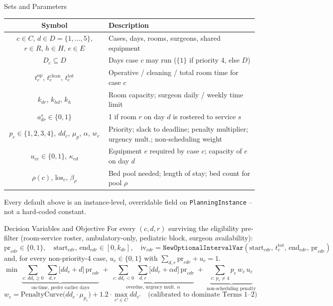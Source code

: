 \documentclass[aspectratio=169]{beamer}
\begin{document}
\begin{frame}{Sets and Parameters}
  \footnotesize
  \begin{table}
    \centering\tiny
    \begin{tabular}{cl}
      \toprule
      Symbol & Description \\
      \midrule
      $c \in C$, $d \in D=\{1,\ldots,5\}$, $r \in R$, $h \in H$, $e \in E$ & Cases, days,
        rooms, surgeons, shared equipment \\
      $D_c \subseteq D$ & Days case $c$ may run ($\{1\}$ if priority 4, else $D$) \\
      $t_c^{\text{op}}$, $t_c^{\text{clean}}$, $t_c^{\text{tot}}$ & Operative / cleaning
        / total room time for case $c$ \\
      $k_{dr}$, $k_{hd}$, $k_h$ & Room capacity; surgeon daily / weekly time limit \\
      $a_{dr}^{s}\in\{0,1\}$ & 1 if room $r$ on day $d$ is rostered to service $s$ \\
      $p_c \in \{1,2,3,4\}$, $dd_c$, $\mu_p$, $\alpha$, $w_c$ & Priority; slack to
        deadline; penalty multiplier; urgency mult.; non-scheduling weight \\
      $u_{ce}\in\{0,1\}$, $\kappa_{ed}$ & Equipment $e$ required by case $c$; capacity
        of $e$ on day $d$ \\
      $\rho(c)$, $\text{los}_c$, $\beta_\rho$ & Bed pool needed; length of stay; bed
        count for pool $\rho$ \\
      \bottomrule
    \end{tabular}
  \end{table}
  Every default above is an instance-level, overridable field on
  \texttt{PlanningInstance} -- not a hard-coded constant.
\end{frame}

\begin{frame}{Decision Variables and Objective}
  \footnotesize
  For every $(c,d,r)$ surviving the eligibility pre-filter (room-service roster,
  ambulatory-only, pediatric block, surgeon availability):
  \[
    \text{pr}_{cdr}\in\{0,1\},\quad \text{start}_{cdr},\,\text{end}_{cdr}\in[0,k_{dr}],
    \quad \text{iv}_{cdr}=\texttt{NewOptionalIntervalVar}(\text{start}_{cdr},\,t_c^{\text{tot}},\,\text{end}_{cdr},\,\text{pr}_{cdr})
  \]
  and, for every non-priority-4 case, $u_c\in\{0,1\}$ with $\sum_{d,r}\text{pr}_{cdr}+u_c=1$.
  \vfill
  \[
    \min \;
    \underbrace{\sum_{c:\,dd_c \ge 0}\ \sum_{d,r} \big[dd_c + d\big]\, \text{pr}_{cdr}}_{\text{on-time, prefer earlier days}}
    \;+\;
    \underbrace{\sum_{c:\,dd_c < 0}\ \sum_{d,r} \big[dd_c + \alpha d\big]\, \text{pr}_{cdr}}_{\text{overdue, urgency mult. }\alpha}
    \;+\;
    \underbrace{\sum_{c:\,p_c \ne 4} p_c\, w_c\, u_c}_{\text{non-scheduling penalty}}
  \]
  \[
    w_c = \text{PenaltyCurve}\big(dd_c \cdot \mu_{p_c}\big) + 1.2 \cdot \max_{c'\in C} dd_{c'}
    \quad \text{(calibrated to dominate Terms 1--2)}
  \]
\end{frame}
\end{document}
